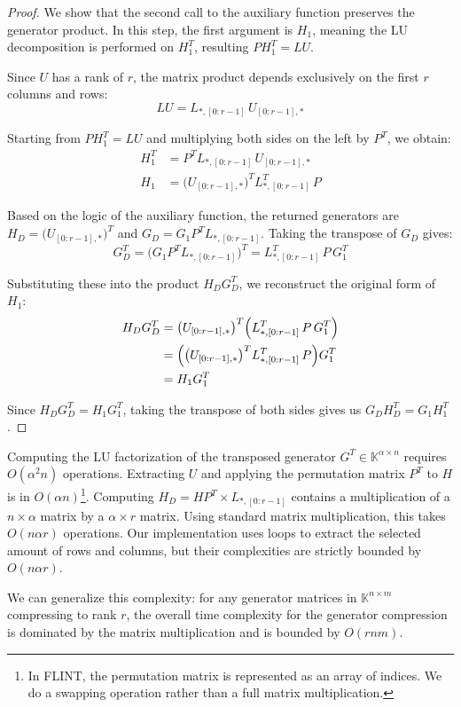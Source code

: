 \begin{proof}
  We show that the second call to the auxiliary function preserves
  the generator product. In this step, the first argument is $H_1$,
  meaning the LU decomposition is performed on $H_1^T$, resulting $P
  H_1^T = L U$.

  Since $U$ has a rank of $r$, the matrix product depends exclusively
  on the first $r$ columns and rows:
  \[ LU = L_{*,[0:r-1]}\, U_{[0:r-1],*} \]

  Starting from $P H_1^T = LU$ and multiplying both sides on the left
  by $P^T$, we obtain:
  \begin{align*}
    H_1^T &= P^T L_{*,[0:r-1]}\, U_{[0:r-1],*} \\
    H_1 &= \bigl(U_{[0:r-1],*}\bigr)^T L_{*,[0:r-1]}^T\, P
  \end{align*}

  Based on the logic of the auxiliary function, the returned
  generators are $H_D = \bigl(U_{[0:r-1],*}\bigr)^T$ and $G_D = G_1
  P^T L_{*,[0:r-1]}$. Taking the transpose of $G_D$ gives:
  \[
    G_D^T = \bigl(G_1 P^T L_{*,[0:r-1]}\bigr)^T = L_{*,[0:r-1]}^T\, P\, G_1^T
  \]

  Substituting these into the product $H_D G_D^T$, we reconstruct the
  original form of $H_1$:
  \begin{align*}
    H_D G_D^T &= \bigl(U_{[0:r-1],*}\bigr)^T \Bigl( L_{*,[0:r-1]}^T\,
    P\, G_1^T \Bigr) \\
    &= \Bigl( \bigl(U_{[0:r-1],*}\bigr)^T L_{*,[0:r-1]}^T\, P \Bigr) G_1^T \\
    &= H_1 G_1^T
  \end{align*}

  Since $H_D G_D^T = H_1 G_1^T$, taking the transpose of both sides
  gives us $G_D H_D^T = G_1 H_1^T$.
\end{proof}

Computing the LU factorization of the transposed generator $G^T \in
\mathbb{K}^{\alpha \times n}$ requires $O(\alpha^2 n)$ operations.
Extracting $U$ and applying the permutation matrix $P^T$ to $H$ is in
$O(\alpha n)$\footnote{In FLINT\cite{flint331}, the permutation
  matrix is represented as an array of indices. We do a swapping
operation rather than a full matrix multiplication.}.
Computing $H_{D} = H P^T \times L_{*,[0:r-1]}$ contains a
multiplication of a $n \times \alpha$ matrix by a $\alpha \times r$
matrix. Using standard matrix multiplication, this takes $O(n \alpha
r)$ operations.
Our implementation uses loops to extract the selected amount of rows
and columns, but their complexities are strictly bounded by $O(n \alpha r)$.

We can generalize this complexity: for any generator matrices in
$\mathbb{K}^{n \times m}$ compressing to rank $r$, the overall time
complexity for the generator compression is dominated by the matrix
multiplication and is bounded by $O(r n m)$.
